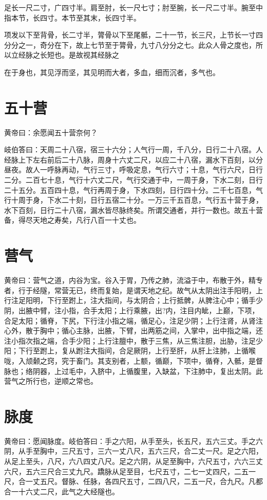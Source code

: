 \documentclass[a4paper,12pt,UTF8,twoside]{ctexbook}
\begin{document}
	足长一尺二寸，广四寸半。肩至肘，长一尺七寸；肘至腕，长一尺二寸半。腕至中指本节，长四寸。本节至其末，长四寸半。
	
	项发以下至背骨，长二寸半，膂骨以下至尾骶，二十一节，长三尺，上节长一寸四分分之一，奇分在下，故上七节至于膂骨，九寸八分分之七。此众人骨之度也，所以立经脉之长短也。是故视其经脉之
	
	在于身也，其见浮而坚，其见明而大者，多血，细而沉者，多气也。
	\chapter{五十营}
	
	黄帝曰：余愿闻五十营奈何？
	
	岐伯答曰：天周二十八宿，宿三十六分；人气行一周，千八分，日行二十八宿。人经脉上下左右前后二十八脉，周身十六丈二尺，以应二十八宿，漏水下百刻，以分昼夜。故人一呼脉再动，气行三寸，呼吸定息，气行六寸；十息，气行六尺，日行二分。二百七十息，气行十六丈二尺，气行交通于中，一周于身，下水二刻，日行二十五分。五百四十息，气行再周于身，下水四刻，日行四十分。二千七百息，气行十周于身，下水二十刻，日行五宿二十分。一万三千五百息，气行五十营于身，水下百刻，日行二十八宿，漏水皆尽脉终矣。所谓交通者，并行一数也。故五十营备，得尽天地之寿矣，凡行八百一十丈也。
	\chapter{营气}
	
	黄帝曰：营气之道，内谷为宝。谷入于胃，乃传之肺，流溢于中，布散于外，精专者，行于经隧，常营无已，终而复始，是谓天地之纪。故气从太阴出注手阳明，上行注足阳明，下行至跗上，注大指间，与太阴合；上行抵髀，从脾注心中；循手少阴，出腋中臂，注小指，合手太阳；上行乘腋，出?内，注目内眦，上巅，下项，合足太阳；循脊，下尻，下行注小指之端，循足心，注足少阴；上行注肾，从肾注心外，散于胸中；循心主脉，出腋，下臂，出两筋之间，入掌中，出中指之端，还注小指次指之端，合手少阳；上行注膻中，散于三焦，从三焦注胆，出胁，注足少阳；下行至跗上，复从跗注大指间，合足厥阴，上行至肝，从肝上注肺，上循喉咙，入颃颡之窍，究于畜门。其支别者，上额，循巅，下项中，循脊，入骶，是督脉也；络阴器，上过毛中，入脐中，上循腹里，入缺盆，下注肺中，复出太阴。此营气之所行也，逆顺之常也。
	\chapter{脉度}
	
	黄帝曰：愿闻脉度。岐伯答曰：手之六阳，从手至头，长五尺，五六三丈。手之六阴，从手至胸中，三尺五寸，三六一丈八尺，五六三尺，合二丈一尺。足之六阳，从足上至头，八尺，六八四丈八尺。足之六阴，从足至胸中，六尺五寸，六六三丈六尺，五六三尺合三丈九尺。蹻脉从足至目，七尺五寸，二七一丈四尺，二五一尺，合一丈五尺。督脉、任脉，各四尺五寸，二四八尺，二五一尺，合九尺。凡都合一十六丈二尺，此气之大经隧也。
	
\end{document}

